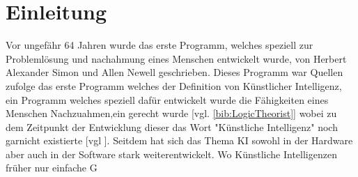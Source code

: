 \section{Einleitung}
\label{sec:einleitung}
Vor ungefähr 64 Jahren wurde das erste Programm, welches speziell zur Problemlösung und nachahmung eines Menschen entwickelt wurde, von Herbert Alexander Simon und Allen Newell geschrieben. Dieses Programm war Quellen zufolge das erste Programm welches der Definition von Künstlicher Intelligenz, ein Programm welches speziell dafür entwickelt wurde die Fähigkeiten eines Menschen Nachzuahmen,ein gerecht wurde [vgl. \ref{bib:LogicTheorist}] wobei zu dem Zeitpunkt der Entwicklung dieser das Wort "Künstliche Intelligenz" noch garnicht existierte [vgl ]. Seitdem hat sich das Thema KI sowohl in der Hardware aber auch in der Software stark weiterentwickelt. Wo Künstliche Intelligenzen früher nur einfache G